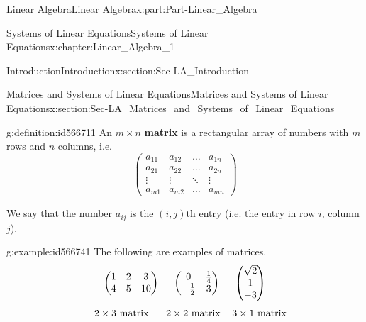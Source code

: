 \documentclass[oneside,10pt,]{book}
\newcommand{\terminology}[1]{\textbf{#1}}
\numberwithin{equation}{section}
\newcommand{\amp}{&}
\begin{document}
\begin{partptx}{Linear Algebra}{}{Linear Algebra}{}{}{x:part:Part-Linear_Algebra}
\begin{chapterptx}{Systems of Linear Equations}{}{Systems of Linear Equations}{}{}{x:chapter:Linear_Algebra_1}
\begin{sectionptx}{Introduction}{}{Introduction}{}{}{x:section:Sec-LA_Introduction}
\end{sectionptx}
%
%
\typeout{************************************************}
\typeout{************************************************}
%
\begin{sectionptx}{Matrices and Systems of Linear Equations}{}{Matrices and Systems of Linear Equations}{}{}{x:section:Sec-LA_Matrices_and_Systems_of_Linear_Equations}
\begin{definition}{}{g:definition:id566711}%
An \(m\times n\) \terminology{matrix} is a rectangular array of numbers with \(m\) rows and \(n\) columns, i.e.%
\begin{equation*}
\begin{pmatrix} a_{11} \amp a_{12} \amp \dots \amp a_{1n} \\ a_{21} \amp a_{22} \amp \dots \amp a_{2n} \\ \vdots \amp \vdots \amp \ddots \amp \vdots \\ a_{m1} \amp a_{m2} \amp \dots \amp a_{mn} \end{pmatrix} 
\end{equation*}
%
\par
We say that the number \(a_{ij}\) is the \((i,j)\)th entry (i.e. the entry in row \(i\), column \(j\)).%
\end{definition}
\begin{example}{}{g:example:id566741}%
The following are examples of matrices.%
\begin{equation*}
\begin{pmatrix} 1 \amp 2 \amp 3 \\ 4 \amp 5 \amp 10 \end{pmatrix} \hspace{5mm} \begin{pmatrix} 0 \amp \frac{1}{4} \\ -\frac{1}{2} \amp 3 \end{pmatrix} \hspace{5mm} \begin{pmatrix} \sqrt{2} \\ 1 \\ -3 \end{pmatrix} 
\end{equation*}
%
\begin{equation*}
\hspace{5mm} 2\times 3 \textrm{ matrix } \hspace{5mm} 2\times 2 \textrm{ matrix } \hspace{3mm} 3\times 1 \textrm{ matrix }

\end{equation*}
\end{example}
\end{sectionptx}
\end{chapterptx}
\end{partptx}
\end{document}
